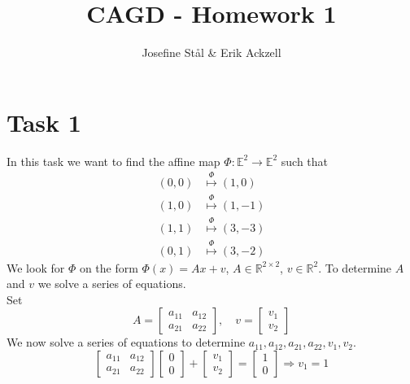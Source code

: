 \documentclass[]{article}
\title{CAGD - Homework 1}
\author{Josefine St{\aa}l \& Erik Ackzell}
\begin{document}
\maketitle
\section*{Task 1}
In this task we want to find the affine map $\Phi:\mathbb{E}^2 \rightarrow \mathbb{E}^2$ such that \begin{equation*}
\begin{aligned}
(0,0)&\overset{\Phi}{\mapsto}(1,0)\\
(1,0)&\overset{\Phi}{\mapsto}(1,-1)\\
(1,1)&\overset{\Phi}{\mapsto}(3,-3)\\
(0,1)&\overset{\Phi}{\mapsto}(3,-2)
\end{aligned}
\end{equation*}
We look for $\Phi$ on the form $\Phi(x) = Ax + v$, $A\in \mathbb{R}^{2\times 2}$, $v\in \mathbb{R}^2$. To determine $A$ and $v$ we solve a series of equations.\\
Set \begin{equation*}
A=\left[\begin{array}{cc}
a_{11}&a_{12}\\
a_{21}&a_{22}
\end{array}\right], \quad v=\left[\begin{array}{c}
v_1\\
v_2
\end{array}\right]
\end{equation*}
We now solve a series of equations to determine $a_{11}, a_{12}, a_{21}, a_{22}, v_1, v_2$.
\begin{equation}
\left[\begin{array}{cc}
a_{11}&a_{12}\\
a_{21}&a_{22}
\end{array}\right]\left[\begin{array}{c}
0\\
0
\end{array}\right] + \left[\begin{array}{c}
v_1\\
v_2
\end{array}\right] = \left[\begin{array}{c}
1\\
0
\end{array}\right]\Rightarrow v_1=1\label{first}
\end{equation}
\end{document}
